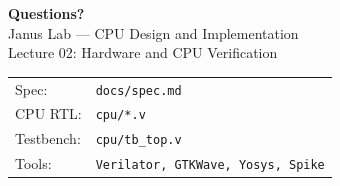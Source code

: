 \documentclass[aspectratio=169,10pt]{beamer}
\begin{document}
\begin{frame}
  \begin{center}
    \vspace{1.5em}
    {\Large\textbf{Questions?}}\\[1.5em]
    \large Janus Lab --- CPU Design and Implementation\\[0.5em]
    \normalsize Lecture 02: Hardware and CPU Verification\\[2em]
    \small
    \begin{tabular}{ll}
      Spec:      & \texttt{docs/spec.md} \\
      CPU RTL:   & \texttt{cpu/*.v} \\
      Testbench: & \texttt{cpu/tb\_top.v} \\
      Tools:     & \texttt{Verilator, GTKWave, Yosys, Spike} \\
    \end{tabular}
  \end{center}
\end{frame}
\end{document}
